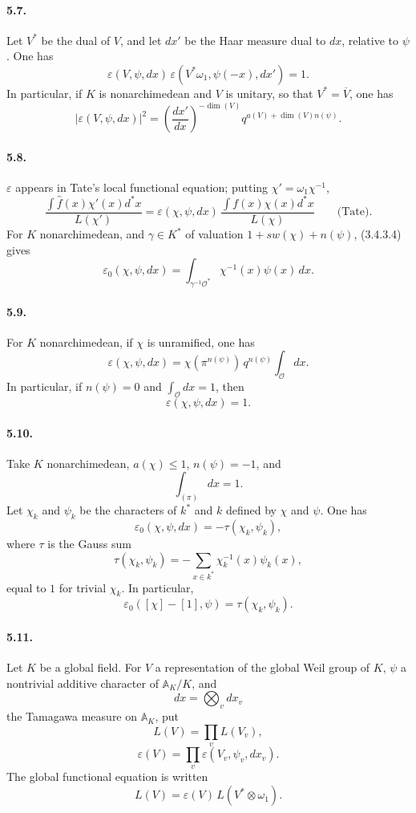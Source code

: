 \documentclass[10pt,letterpaper]{article}
\begin{document}
\paragraph{5.7.} Let \(V^*\) be the dual of \(V\), and let \(dx'\) be the Haar measure dual to \(dx\), relative to \(\psi\). One has
\[
\tag{5.7.1}
\varepsilon(V,\psi,dx)\,
\varepsilon(V^*\omega_1,\psi(-x),dx')=1.
\]
In particular, if \(K\) is nonarchimedean and \(V\) is unitary, so that \(V^*=\overline V\), one has
\[
\tag{5.7.2}
|\varepsilon(V,\psi,dx)|^2
=
\left(\frac{dx'}{dx}\right)^{-\dim(V)}
q^{a(V)+\dim(V)n(\psi)}.
\]

\paragraph{5.8.} \(\varepsilon\) appears in Tate's local functional equation; putting \(\chi'=\omega_1\chi^{-1}\),
\[
\tag{5.8.1}
\frac{\displaystyle\int \widehat f(x)\chi'(x)d^*x}{L(\chi')}
=
\varepsilon(\chi,\psi,dx)\,
\frac{\displaystyle\int f(x)\chi(x)d^*x}{L(\chi)}
\qquad\text{(Tate).}
\]
For \(K\) nonarchimedean, and \(\gamma\in K^*\) of valuation \(1+sw(\chi)+n(\psi)\), (3.4.3.4) gives
\[
\tag{5.8.2}
\varepsilon_0(\chi,\psi,dx)
=
\int_{\gamma^{-1}\mathcal O^*}\chi^{-1}(x)\psi(x)\,dx.
\]

\paragraph{5.9.} For \(K\) nonarchimedean, if \(\chi\) is unramified, one has
\[
\varepsilon(\chi,\psi,dx)
=
\chi(\pi^{n(\psi)})\,q^{n(\psi)}
\int_{\mathcal O}dx.
\]
In particular, if \(n(\psi)=0\) and \(\int_{\mathcal O}dx=1\), then
\[
\varepsilon(\chi,\psi,dx)=1.
\]

\paragraph{5.10.} Take \(K\) nonarchimedean, \(a(\chi)\le1\), \(n(\psi)=-1\), and
\[
\int_{(\pi)}dx=1.
\]
Let \(\chi_k\) and \(\psi_k\) be the characters of \(k^*\) and \(k\) defined by \(\chi\) and \(\psi\). One has
\[
\tag{5.10.1}
\varepsilon_0(\chi,\psi,dx)=-\tau(\chi_k,\psi_k),
\]
where \(\tau\) is the Gauss sum
\[
\tag{5.10.2}
\tau(\chi_k,\psi_k)
=
-\sum_{x\in k^*}\chi_k^{-1}(x)\psi_k(x),
\]
equal to \(1\) for trivial \(\chi_k\). In particular,
\[
\tag{5.10.3}
\varepsilon_0([\chi]-[1],\psi)=\tau(\chi_k,\psi_k).
\]




\paragraph{5.11.} Let \(K\) be a global field. For \(V\) a representation of the global Weil group of \(K\), \(\psi\) a nontrivial additive character of \(\mathbb A_K/K\), and
\[
dx=\bigotimes_v dx_v
\]
the Tamagawa measure on \(\mathbb A_K\), put
\[
\tag{5.11.1}
L(V)=\prod_v L(V_v),
\]
\[
\tag{5.11.2}
\varepsilon(V)=\prod_v\varepsilon(V_v,\psi_v,dx_v).
\]
The global functional equation is written
\[
\tag{5.11.3}
L(V)=\varepsilon(V)\,L(V^*\otimes\omega_1).
\]
\end{document}
